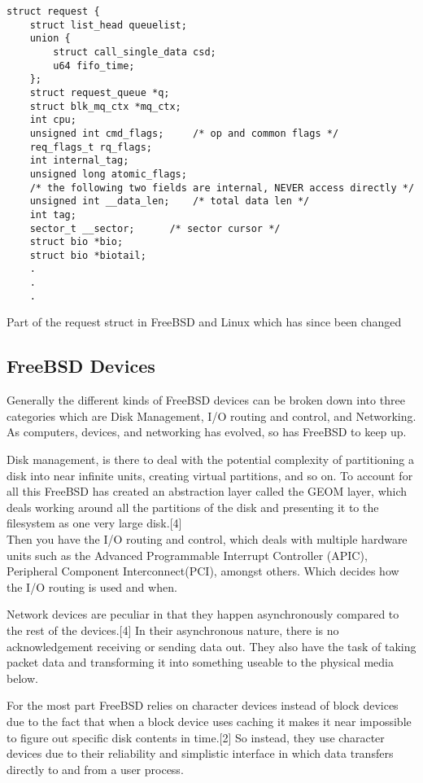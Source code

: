 \documentclass[10pt,conference,draftclsnofoot,onecolumn]{IEEEtran}
\begin{document}
\begin{lstlisting}
struct request {
	struct list_head queuelist;
	union {
		struct call_single_data csd;
		u64 fifo_time;
	};
	struct request_queue *q;
	struct blk_mq_ctx *mq_ctx;
	int cpu;
	unsigned int cmd_flags;		/* op and common flags */
	req_flags_t rq_flags;
	int internal_tag;
	unsigned long atomic_flags;
	/* the following two fields are internal, NEVER access directly */
	unsigned int __data_len;	/* total data len */
	int tag;
	sector_t __sector;		/* sector cursor */
	struct bio *bio;
	struct bio *biotail;
	.
	.
	.

\end{lstlisting}
\center Part of the request struct in FreeBSD and Linux which has since been changed \newline


\subsection{FreeBSD Devices}
Generally the different kinds of FreeBSD devices can be broken down into three categories which are Disk Management, I/O routing and control, and Networking. As computers, devices, and networking has evolved, so has FreeBSD to keep up.

Disk management, is there to deal with the potential complexity of partitioning a disk into near infinite units, creating virtual partitions, and so on. To account for all this FreeBSD has created an abstraction layer called the GEOM layer, which deals working around all the partitions of the disk and presenting it to the filesystem as one very large disk.[4] \\

Then you have the I/O routing and control, which deals with multiple hardware units such as the Advanced Programmable Interrupt Controller (APIC), Peripheral Component Interconnect(PCI), amongst others. Which decides how the I/O routing is used and when.

Network devices are peculiar in that they happen asynchronously compared to the rest of the devices.[4] In their asynchronous nature, there is no acknowledgement receiving or sending data out. They also have the task of taking packet data and transforming it into something useable to the physical media below.

For the most part FreeBSD relies on character devices instead of block devices due to the fact that when a block device uses caching it makes it near impossible to figure out specific disk contents in time.[2] So instead, they use character devices due to their reliability and simplistic interface in which data transfers directly to and from a user process.
\end{document}
